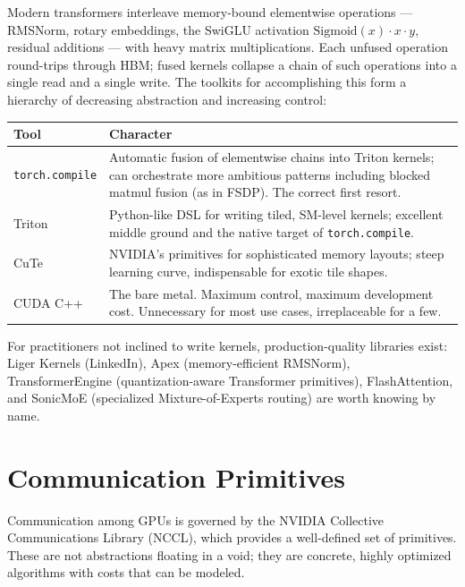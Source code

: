 \documentclass[11pt,a4paper]{article}
\theoremstyle{definition}
\theoremstyle{remark}
\theoremstyle{plain}
\begin{document}
Modern transformers interleave memory-bound elementwise operations --- RMSNorm, rotary embeddings, the SwiGLU activation $\mathrm{Sigmoid}(x) \cdot x \cdot y$, residual additions --- with heavy matrix multiplications. Each unfused operation round-trips through HBM; fused kernels collapse a chain of such operations into a single read and a single write. The toolkits for accomplishing this form a hierarchy of decreasing abstraction and increasing control:

\begin{center}
\begin{tabular}{p{3.2cm}p{11cm}}
\toprule
\textbf{Tool} & \textbf{Character} \\
\midrule
\texttt{torch.compile} & Automatic fusion of elementwise chains into Triton kernels; can orchestrate more ambitious patterns including blocked matmul fusion (as in FSDP). The correct first resort. \\
Triton                 & Python-like DSL for writing tiled, SM-level kernels; excellent middle ground and the native target of \texttt{torch.compile}. \\
CuTe                   & NVIDIA's primitives for sophisticated memory layouts; steep learning curve, indispensable for exotic tile shapes. \\
CUDA C++               & The bare metal. Maximum control, maximum development cost. Unnecessary for most use cases, irreplaceable for a few. \\
\bottomrule
\end{tabular}
\end{center}

For practitioners not inclined to write kernels, production-quality libraries exist: Liger Kernels (LinkedIn), Apex (memory-efficient RMSNorm), TransformerEngine (quantization-aware Transformer primitives), FlashAttention, and SonicMoE (specialized Mixture-of-Experts routing) are worth knowing by name.

\section{Communication Primitives}
\label{sec:nccl}


Communication among GPUs is governed by the NVIDIA Collective Communications Library (NCCL), which provides a well-defined set of primitives. These are not abstractions floating in a void; they are concrete, highly optimized algorithms with costs that can be modeled.
\end{document}
